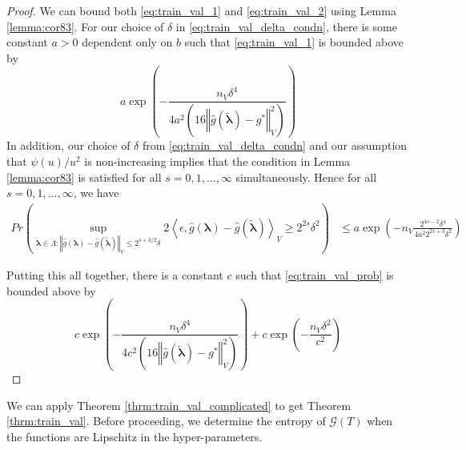 \documentclass[12pt]{article}
\begin{document}
\begin{proof}
	We can bound both \eqref{eq:train_val_1} and \eqref{eq:train_val_2} using Lemma \ref{lemma:cor83}. For our choice of $\delta$ in \eqref{eq:train_val_delta_condn},
	there is some constant $a>0$ dependent only on $b$ such that \eqref{eq:train_val_1} is bounded above by
	\[ 
	a\exp\left(-\frac{n_{V}\delta^{4}}{4a^{2}\left(16\left\Vert \hat{g}(\tilde{\boldsymbol{\lambda}})-g^{*}\right\Vert _{V}^{2}\right)}\right)
	\]
	In addition, our choice of $\delta$ from \eqref{eq:train_val_delta_condn} and our assumption that $\psi(u)/u^2$ is non-increasing implies that the condition in Lemma \ref{lemma:cor83} is satisfied for all $s=0,1,...,\infty$ simultaneously. Hence for all $s=0,1,...,\infty$, we have
	\begin{align}
	Pr\left(
	\sup_{\boldsymbol{\lambda} \in \Lambda: \left\Vert \hat{g}({\boldsymbol{\lambda}})-\hat{g}(\tilde{\boldsymbol{\lambda}})\right\Vert _{V}
		\le
		2^{s+3/2}\delta}
	2\left\langle \epsilon,\hat{g}({\boldsymbol{\lambda}})-\hat{g}(\tilde{\boldsymbol{\lambda}})\right\rangle _{V}
	\ge
	2^{2s} \delta^{2}
	\right)
	& \le 
	a\exp\left(-n_{V}\frac{2^{4s-2}\delta^{4}}{4a^{2}2^{2s+3}\delta^{2}}\right)
	\end{align}
	
	Putting this all together, there is a constant $c$ such that \eqref{eq:train_val_prob} is bounded above by
	\begin{equation}
	c\exp\left(-\frac{n_{V}\delta^{4}}{4 c^{2}\left(16\left\Vert \hat{g}(\tilde{\boldsymbol{\lambda}})-g^{*}\right\Vert _{V}^{2}\right)}\right)
	+
	c\exp\left(-\frac{n_{V} \delta^2}{c^{2}}\right)
	\end{equation}
	
\end{proof}

We can apply Theorem \ref{thrm:train_val_complicated} to get Theorem \ref{thrm:train_val}. Before proceeding, we determine the entropy of $\mathcal{G}(T)$ when the functions are Lipschitz in the hyper-parameters.
\end{document}
